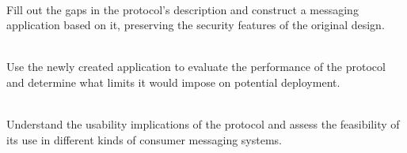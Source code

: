 \documentclass[a4paper, twoside, 12pt]{report}
\begin{document}
\begin{description}[labelindent=0.5cm, leftmargin=1.3cm, rightmargin=0.5cm]
    \item[Implementation] \hfill \\
        Fill out the gaps in the protocol's description and construct a messaging application based on it, preserving the security features of the original design.
        
    \item[Evaluation of Performance] \hfill \\
        Use the newly created application to evaluate the performance of the protocol and determine what limits it would impose on potential deployment.
        
    \item[Evaluation of Usability] \hfill \\
        Understand the usability implications of the protocol and assess the feasibility of its use in different kinds of consumer messaging systems.

\end{description}
\end{document}
